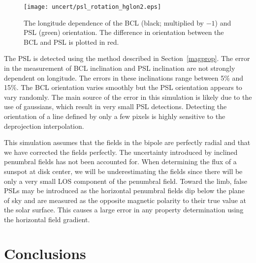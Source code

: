 \begin{figure}[!t]
\centerline{\texttt{[image: uncert/psl\_rotation\_hglon2.eps]}}
\caption[The longitude dependence of the BCL and PSL orientation.]{The longitude dependence of the BCL (black; multiplied by $-1$) and PSL (green) orientation. The difference in orientation between the BCL and PSL is plotted in red.}
\label{fig:bipolerotation}
\end{figure}

The \gls{PSL} is detected using the method described in Section~\ref{magprop}. The error in the measurement of \gls{BCL} inclination and \gls{PSL} inclination are not strongly dependent on longitude. The errors in these inclinations range between 5\% and 15\%. The \gls{BCL} orientation varies smoothly but the \gls{PSL} orientation appears to vary randomly. The main source of the error in this simulation is likely due to the use of gaussians, which result in very small \gls{PSL} detections. Detecting the orientation of a line defined by only a few pixels is highly sensitive to the deprojection interpolation.

This simulation assumes that the fields in the bipole are perfectly radial and that we have corrected the fields perfectly. The uncertainty introduced by inclined penumbral fields has not been accounted for. When determining the flux of a sunspot at disk center, we will be underestimating the fields since there will be only a very small \gls{LOS} component of the penumbral field. Toward the limb, false \glspl{PSL} may be introduced as the horizontal penumbral fields dip below the plane of sky and are measured as the opposite magnetic polarity to their true value at the solar surface. This causes a large error in any property determination using the horizontal field gradient.


\section{Conclusions}\label{sect:smartconc}

